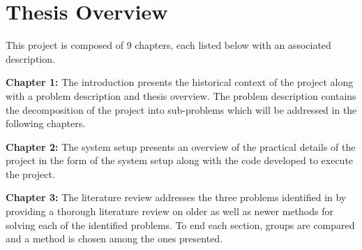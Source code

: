 

\section{Thesis Overview}\label{sec:intro-thesis-overview}

This project is composed of \num{9} chapters, each listed below with an associated description. \medskip


\textbf{Chapter 1:} The introduction presents the historical context of the project along with a problem description and thesis overview. The problem description contains the decomposition of the project into sub-problems which will be addressed in the following chapters. \medskip

\textbf{Chapter 2:} The system setup presents an overview of the practical details of the project in the form of the system setup along with the code developed to execute the project. \medskip

\textbf{Chapter 3:} The literature review addresses the three problems identified in  by providing a thorough literature review on older as well as newer methods for solving each of the identified problems. To end each section, groups are compared and a method is chosen among the ones presented. \medskip

